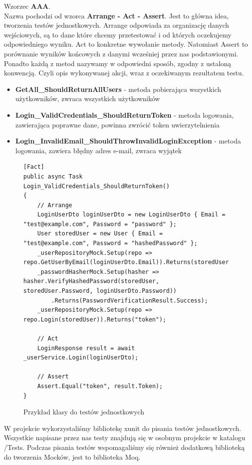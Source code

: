 \documentclass[a4paper,twoside,12pt]{book}
\begin{document}
Wzorzec \textbf{AAA}. \\
Nazwa pochodzi od wzorca \textbf{Arrange - Act - Assert}. Jest to główna idea, tworzenia testów jednostkowych. Arrange odpowiada za organizację danych wejściowych, są to dane które chcemy przetestować i od których oczekujemy odpowiedniego wyniku. Act to konkretne wywołanie metody. Natomiast Assert to porównanie wyników końcowych z danymi wcześniej przez nas podstawionymi. Ponadto każdą z metod nazywamy w odpowiedni sposób, zgodny z ustaloną konwencją. Czyli opis wykonywanej akcji, wraz z oczekiwanym rezultatem testu.
\begin{itemize}
    \item \textbf{GetAll\_ShouldReturnAllUsers} - metoda pobierająca wszystkich użytkowników, zwraca wszystkich użytkowników
    \item \textbf{Login\_ValidCredentials\_ShouldReturnToken} - metoda logowania, zawierająca poprawne dane, powinna zwrócić token uwierzytelnienia
    \item \textbf{Login\_InvalidEmail\_ShouldThrowInvalidLoginException} - metoda logowania, zawiera błędny adres e-mail, zwraca wyjątek
\end{itemize}

    \begin{figure}[H]
        \begin{lstlisting}
[Fact]
public async Task Login_ValidCredentials_ShouldReturnToken()
{
    // Arrange
    LoginUserDto loginUserDto = new LoginUserDto { Email = "test@example.com", Password = "password" };
    User storedUser = new User { Email = "test@example.com", Password = "hashedPassword" };
    _userRepositoryMock.Setup(repo => repo.GetUserByEmail(loginUserDto.Email)).Returns(storedUser);
    _passwordHasherMock.Setup(hasher => hasher.VerifyHashedPassword(storedUser, storedUser.Password, loginUserDto.Password))
        .Returns(PasswordVerificationResult.Success);
    _userRepositoryMock.Setup(repo => repo.Login(storedUser)).Returns("token");

    // Act
    LoginResponse result = await _userService.Login(loginUserDto);

    // Assert
    Assert.Equal("token", result.Token);
}
        \end{lstlisting}
    \caption{Przykład klasy do testów jednostkowych}
    \label{fig:pseudokod:listings}
    \end{figure}


W projekcie wykorzystaliśmy bibliotekę xunit do pisania testów jednostkowych. Wszystkie napisane przez nas testy znajdują się w osobnym projekcie w katalogu /Tests. Podczas pisania testów wspomagaliśmy się również dodatkową biblioteką do tworzenia Mocków, jest to biblioteka Moq.
\end{document}
